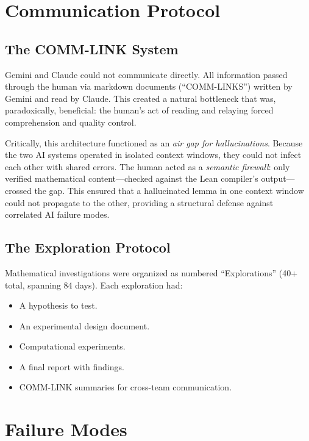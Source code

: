 \documentclass[11pt,a4paper]{article}
\begin{document}
\section{Communication Protocol}

\subsection{The COMM-LINK System}

Gemini and Claude could not communicate directly. All information
passed through the human via markdown documents (``COMM-LINKS'')
written by Gemini and read by Claude. This created a natural
bottleneck that was, paradoxically, beneficial: the human's act of
reading and relaying forced comprehension and quality control.

Critically, this architecture functioned as an \emph{air gap for
hallucinations}. Because the two AI systems operated in isolated
context windows, they could not infect each other with shared errors.
The human acted as a \emph{semantic firewall}: only verified
mathematical content---checked against the Lean compiler's
output---crossed the gap. This ensured that a hallucinated lemma
in one context window could not propagate to the other, providing
a structural defense against correlated AI failure modes.

\subsection{The Exploration Protocol}

Mathematical investigations were organized as numbered
``Explorations'' (40+ total, spanning 84 days). Each exploration had:
\begin{itemize}
  \item A hypothesis to test.
  \item An experimental design document.
  \item Computational experiments.
  \item A final report with findings.
  \item COMM-LINK summaries for cross-team communication.
\end{itemize}

\section{Failure Modes}
\end{document}

